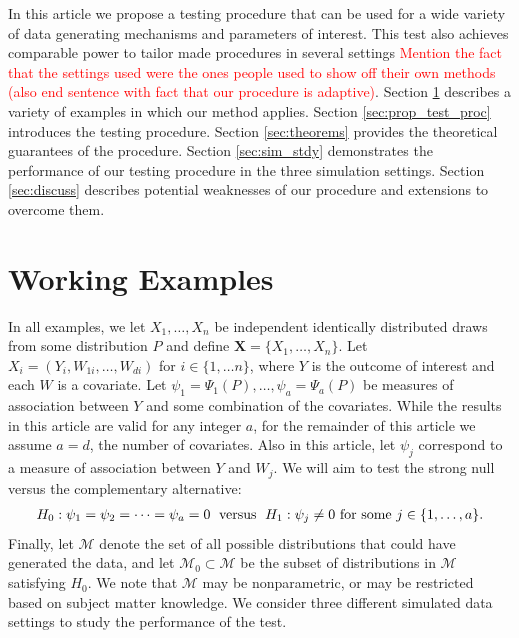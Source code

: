 \documentclass{article}
\newcommand{\rvo}{X}
\newcommand{\disto}{P}
\begin{document}
In this article we propose a testing procedure that can be used for a wide variety of data generating mechanisms and parameters of interest. This test also achieves comparable power to tailor made procedures in several settings \textcolor{red}{Mention the fact that the settings used were the ones people used to show off their own methods  (also end sentence with fact that our procedure is adaptive)}. Section \ref{sec:Working Examples} describes a variety of examples in which our method applies.  Section \ref{sec:prop_test_proc} introduces the testing procedure.  Section \ref{sec:theorems} provides the theoretical guarantees of the procedure. Section \ref{sec:sim_stdy} demonstrates the performance of our testing procedure in the three simulation settings. Section \ref{sec:discuss} describes potential weaknesses of our procedure and extensions to overcome them.


\section{Working Examples}
\label{sec:Working Examples}
In all examples, we let $\rvo_1, \dots, \rvo_n$ be independent identically distributed draws from some distribution $\disto$ and define $\boldsymbol{\rvo} = \{\rvo_1, \dots, \rvo_n\}$. Let $\rvo_i = \left(Y_i, W_{1 i}, \dots, W_{d i}\right)$ for $i \in \{1, \dots n\}$, where $Y$ is the outcome of interest and each $W$ is a covariate. Let $\psi_1 = \Psi_1(\disto), \dots, \psi_a = \Psi_a(\disto)$ be measures of association between $Y$ and some combination of the covariates.  While the results in this article are valid for any integer $a$, for the remainder of this article we assume $a = d$, the number of covariates. Also in this article, let $\psi_j$ correspond to a measure of association between $Y$ and $W_j$.  We will aim to test the strong null versus the complementary alternative: 
\begin{align*}
H_0: \psi_1 = \psi_2 = \dots = \psi_a = 0 \hspace{0.1cm}\text{  versus  } \hspace{0.1cm} H_1: \psi_j \neq 0 \text{ for some } j \in \{1, \dots, a\}.
\end{align*}
Finally, let $\mathscr{M}$ denote the set of all possible distributions that could have generated the data, and let $\mathscr{M}_0  \subset \mathscr{M}$ be the subset of distributions in $\mathscr{M}$ satisfying $H_0$. We note that $\mathscr{M}$ may be nonparametric, or may be restricted based on subject matter knowledge. We consider three different simulated data settings to study the performance of the test. 
\end{document}
